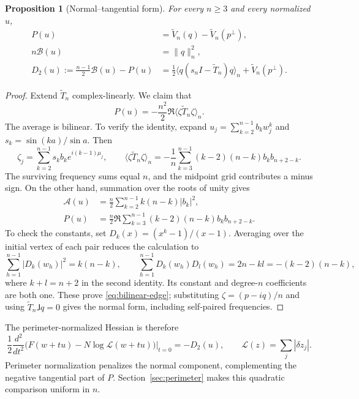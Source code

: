 \documentclass[11pt,reqno]{amsart}
\numberwithin{equation}{section}
\newtheorem{proposition}[theorem]{Proposition}
\theoremstyle{definition}
\theoremstyle{remark}
\newcommand{\A}{\mathcal A}
\newcommand{\B}{\mathcal B}
\newcommand{\av}[1]{\langle #1\rangle_n}
\newcommand{\norm}[1]{\lVert #1\rVert}
\newcommand{\dd}{\delta}
\begin{document}
\begin{proposition}[Normal--tangential form]\label{prop:normal-form}
For every $n\ge3$ and every normalized $u$,
\begin{align}
 P(u)&=\widetilde V_n(q)-\widetilde V_n(p^\perp),\label{eq:normal-P}\\
 n\B(u)&=\norm{q}_n^2,\label{eq:normal-B}\\
 D_2(u):=\frac{n-1}{2}\B(u)-P(u)
 &=\frac12\av{q(s_nI-\widetilde T_n)q}
   +\widetilde V_n(p^\perp).\label{eq:normal-D}
\end{align}
\end{proposition}
\begin{proof}
Extend $\widetilde T_n$ complex-linearly. We claim that
\begin{equation}\label{eq:bilinear-edge}
 P(u)=-\frac{n^2}{2}\Re\av{\zeta\widetilde T_n\zeta}.
\end{equation}
The average is bilinear. To verify the identity, expand $u_j=\sum_{k=2}^{n-1}b_kw_j^k$ and $s_k=\sin(ka)/\sin a$. Then
\[
 \zeta_j=\sum_{k=2}^{n-1}s_kb_ke^{i(k-1)\mu_j},\qquad
 \av{\zeta\widetilde T_n\zeta}
 =-\frac1n\sum_{k=3}^{n-1}(k-2)(n-k)b_kb_{n+2-k}.
\]
The surviving frequency sums equal $n$, and the midpoint grid contributes a minus sign. On the other hand, summation over the roots of unity gives
\begin{align}
 \A(u)&=\frac n2\sum_{k=2}^{n-1}k(n-k)|b_k|^2,\label{eq:A-spectrum}\\
 P(u)&=\frac n2\Re\sum_{k=3}^{n-1}(k-2)(n-k)b_kb_{n+2-k}.\label{eq:P-spectrum}
\end{align}
To check the constants, set $D_k(x)=(x^k-1)/(x-1)$. Averaging over the initial vertex of each pair reduces the calculation to
\[
 \sum_{h=1}^{n-1}|D_k(w_h)|^2=k(n-k),\qquad
 \sum_{h=1}^{n-1}D_k(w_h)D_l(w_h)=2n-kl=-(k-2)(n-k),
\]
where $k+l=n+2$ in the second identity. Its constant and degree-$n$ coefficients are both one. These prove \eqref{eq:bilinear-edge}; substituting $\zeta=(p-iq)/n$ and using $\widetilde T_n\mathsf Jq=0$ gives the normal form, including self-paired frequencies.
\end{proof}

The perimeter-normalized Hessian is therefore
\[
 \frac12\frac{d^2}{dt^2}\bigl(F(w+tu)-N\log\mathcal L(w+tu)\bigr)\Big|_{t=0}=-D_2(u),
 \qquad \mathcal L(z)=\sum_j|\dd z_j|.
\]
Perimeter normalization penalizes the normal component, complementing the negative tangential part of $P$. Section~\ref{sec:perimeter} makes this quadratic comparison uniform in $n$.
\end{document}

